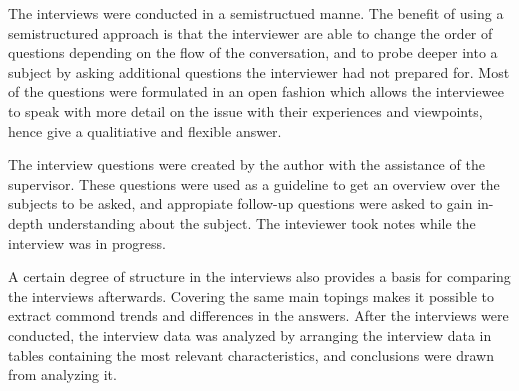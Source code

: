 The interviews were conducted in a semistructued manne. The benefit of using a semistructured approach is that the interviewer are able to change the order of questions depending on the flow of the conversation, and to probe deeper into a subject by asking additional questions the interviewer had not prepared for\cite{Oates:2006:RIS:1202299}. Most of the questions were formulated in an open fashion which allows the interviewee to speak with more detail on the issue with their experiences and viewpoints\cite{Oates:2006:RIS:1202299,Wohlin:2000:ESE:330775}, hence give a qualitiative and flexible answer.

The interview questions were created by the author with the assistance of the supervisor. These questions were used as a guideline to get an overview over the subjects to be asked, and appropiate follow-up questions were asked to gain in-depth understanding about the subject. The inteviewer took notes while the interview was in progress. 

A certain degree of structure in the interviews also provides a basis for comparing the interviews afterwards. Covering the same main topings makes it possible to extract commond trends and differences in the answers. After the interviews were conducted, the interview data was analyzed by arranging the interview data in tables containing the most relevant characteristics, and conclusions were drawn from analyzing it.



